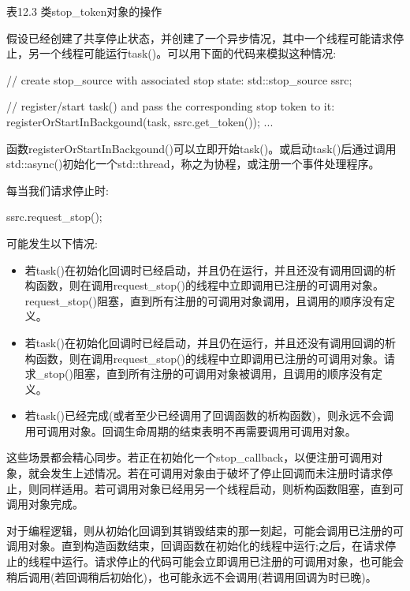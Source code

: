 \begin{center}
表12.3 类stop\_token对象的操作
\end{center}

假设已经创建了共享停止状态，并创建了一个异步情况，其中一个线程可能请求停止，另一个线程可能运行task()。可以用下面的代码来模拟这种情况:

\begin{cpp}
// create stop_source with associated stop state:
std::stop_source ssrc;

// register/start task() and pass the corresponding stop token to it:
registerOrStartInBackgound(task, ssrc.get_token());
...
\end{cpp}

函数registerOrStartInBackgound()可以立即开始task()。或启动task()后通过调用std::async()初始化一个std::thread，称之为协程，或注册一个事件处理程序。

每当我们请求停止时:

\begin{cpp}
ssrc.request_stop();
\end{cpp}

可能发生以下情况:

\begin{itemize}
\item
若task()在初始化回调时已经启动，并且仍在运行，并且还没有调用回调的析构函数，则在调用request\_stop()的线程中立即调用已注册的可调用对象。request\_stop()阻塞，直到所有注册的可调用对象调用，且调用的顺序没有定义。

\item
若task()在初始化回调时已经启动，并且仍在运行，并且还没有调用回调的析构函数，则在调用request\_stop()的线程中立即调用已注册的可调用对象。请求\_stop()阻塞，直到所有注册的可调用对象被调用，且调用的顺序没有定义。

\item
若task()已经完成(或者至少已经调用了回调函数的析构函数)，则永远不会调用可调用对象。回调生命周期的结束表明不再需要调用可调用对象。
\end{itemize}

这些场景都会精心同步。若正在初始化一个stop\_callback，以便注册可调用对象，就会发生上述情况。若在可调用对象由于破坏了停止回调而未注册时请求停止，则同样适用。若可调用对象已经用另一个线程启动，则析构函数阻塞，直到可调用对象完成。

对于编程逻辑，则从初始化回调到其销毁结束的那一刻起，可能会调用已注册的可调用对象。直到构造函数结束，回调函数在初始化的线程中运行;之后，在请求停止的线程中运行。请求停止的代码可能会立即调用已注册的可调用对象，也可能会稍后调用(若回调稍后初始化)，也可能永远不会调用(若调用回调为时已晚)。


